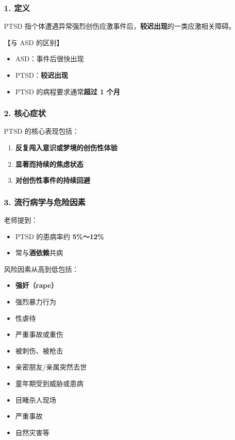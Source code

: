 \documentclass[
  chinese,
  9pt,
  a4paper,
]{ctexart}
\providecommand{\tightlist}{%
  \setlength{\itemsep}{0pt}\setlength{\parskip}{0pt}}
\begin{document}
\subsubsection{1. 定义}\label{ux5b9aux4e49-1}

PTSD
指个体遭遇异常强烈创伤应激事件后，\textbf{较迟出现}的一类应激相关障碍。

【与 ASD 的区别】

\begin{itemize}
\tightlist
\item
  ASD：事件后很快出现
\item
  PTSD：\textbf{较迟出现}
\item
  PTSD 的病程要求通常\textbf{超过 1 个月}
\end{itemize}

\subsubsection{2. 核心症状}\label{ux6838ux5fc3ux75c7ux72b6}

PTSD 的核心表现包括：

\begin{enumerate}
\def\labelenumi{\arabic{enumi}.}
\tightlist
\item
  \textbf{反复闯入意识或梦境的创伤性体验}
\item
  \textbf{显著而持续的焦虑状态}
\item
  \textbf{对创伤性事件的持续回避}
\end{enumerate}

\subsubsection{3.
流行病学与危险因素}\label{ux6d41ux884cux75c5ux5b66ux4e0eux5371ux9669ux56e0ux7d20}

老师提到：

\begin{itemize}
\tightlist
\item
  PTSD 的患病率约 \textbf{5\%～12\%}
\item
  常与\textbf{酒依赖}共病
\end{itemize}

风险因素从高到低包括：

\begin{itemize}
\tightlist
\item
  \textbf{强奸（rape）}
\item
  强烈暴力行为
\item
  性虐待
\item
  严重事故或重伤
\item
  被刺伤、被枪击
\item
  亲密朋友/亲属突然去世
\item
  童年期受到威胁或患病
\item
  目睹杀人现场
\item
  严重事故
\item
  自然灾害等
\end{itemize}
\end{document}

